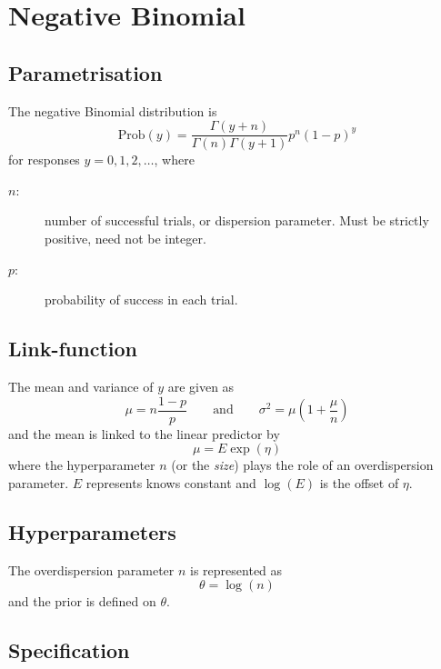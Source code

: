 \documentclass[a4paper,11pt]{article}
\begin{document}
\section*{Negative Binomial}

\subsection*{Parametrisation}

The negative Binomial distribution is
\begin{displaymath}
    \text{Prob}(y) = \frac{\Gamma(y+n)}{\Gamma(n) \Gamma(y+1)} p^n (1-p)^y
\end{displaymath}
for responses $y=0, 1, 2, \ldots$, where
\begin{description}
\item[$n$:] number of successful trials, or dispersion
    parameter. Must be strictly positive, need not be integer.
\item[$p$:] probability of success in each trial.
\end{description}

\subsection*{Link-function}

The mean and variance of $y$ are given as
\begin{displaymath}
    \mu = n \frac{1-p}{p} \qquad\text{and}\qquad \sigma^{2} = \mu(1 + \frac{\mu}{n})
\end{displaymath}
and the mean is linked to the linear predictor by
\begin{displaymath}
    \mu = E \exp(\eta)
\end{displaymath}
where the hyperparameter $n$ (or the \emph{size}) plays the role of an
overdispersion parameter. $E$ represents knows constant and $\log(E)$
is the offset of $\eta$.

\subsection*{Hyperparameters}

The overdispersion parameter $n$ is represented as
\begin{displaymath}
    \theta = \log(n)
\end{displaymath}
and the prior is defined on $\theta$. 

\subsection*{Specification}
\end{document}
